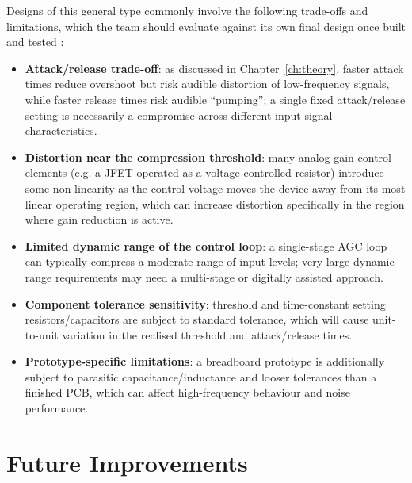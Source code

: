 Designs of this general type commonly involve the following trade-offs and limitations, which the team should evaluate against its own final design once built and tested \cite{ref6}:
\begin{itemize}
    \item \textbf{Attack/release trade-off}: as discussed in Chapter~\ref{ch:theory}, faster attack times reduce overshoot but risk audible distortion of low-frequency signals, while faster release times risk audible ``pumping''; a single fixed attack/release setting is necessarily a compromise across different input signal characteristics.
    \item \textbf{Distortion near the compression threshold}: many analog gain-control elements (e.g. a JFET operated as a voltage-controlled resistor) introduce some non-linearity as the control voltage moves the device away from its most linear operating region, which can increase distortion specifically in the region where gain reduction is active.
    \item \textbf{Limited dynamic range of the control loop}: a single-stage AGC loop can typically compress a moderate range of input levels; very large dynamic-range requirements may need a multi-stage or digitally assisted approach.
    \item \textbf{Component tolerance sensitivity}: threshold and time-constant setting resistors/capacitors are subject to standard tolerance, which will cause unit-to-unit variation in the realised threshold and attack/release times.
    \item \textbf{Prototype-specific limitations}: a breadboard prototype is additionally subject to parasitic capacitance/inductance and looser tolerances than a finished PCB, which can affect high-frequency behaviour and noise performance.
\end{itemize}

\section{Future Improvements}

